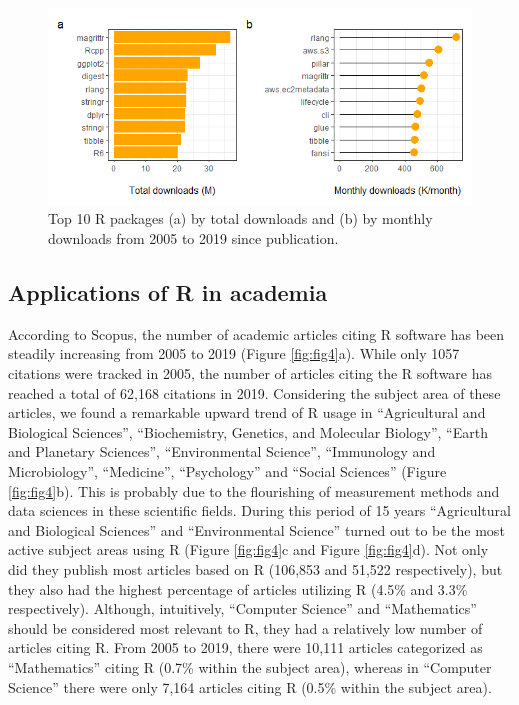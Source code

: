 \begin{Schunk}
\begin{figure}
\includegraphics[width=1\linewidth,height=0.3\textheight]{fig3} \caption[Top 10 R packages (a) by total downloads and (b) by monthly downloads from 2005 to 2019 since publication]{Top 10 R packages (a) by total downloads and (b) by monthly downloads from 2005 to 2019 since publication. }\label{fig:fig3}
\end{figure}
\end{Schunk}

\hypertarget{applications-of-r-in-academia}{%
\subsection{Applications of R in
academia}\label{applications-of-r-in-academia}}

According to Scopus, the number of academic articles citing R software
has been steadily increasing from 2005 to 2019 (Figure \ref{fig:fig4}a).
While only 1057 citations were tracked in 2005, the number of articles
citing the R software has reached a total of 62,168 citations in 2019.
Considering the subject area of these articles, we found a remarkable
upward trend of R usage in ``Agricultural and Biological Sciences'',
``Biochemistry, Genetics, and Molecular Biology'', ``Earth and Planetary
Sciences'', ``Environmental Science'', ``Immunology and Microbiology'',
``Medicine'', ``Psychology'' and ``Social Sciences'' (Figure
\ref{fig:fig4}b). This is probably due to the flourishing of measurement
methods and data sciences in these scientific fields. During this period
of 15 years ``Agricultural and Biological Sciences'' and ``Environmental
Science'' turned out to be the most active subject areas using R (Figure
\ref{fig:fig4}c and Figure \ref{fig:fig4}d). Not only did they publish
most articles based on R (106,853 and 51,522 respectively), but they
also had the highest percentage of articles utilizing R (4.5\% and 3.3\%
respectively). Although, intuitively, ``Computer Science'' and
``Mathematics'' should be considered most relevant to R, they had a
relatively low number of articles citing R. From 2005 to 2019, there
were 10,111 articles categorized as ``Mathematics'' citing R (0.7\%
within the subject area), whereas in ``Computer Science'' there were
only 7,164 articles citing R (0.5\% within the subject area).

